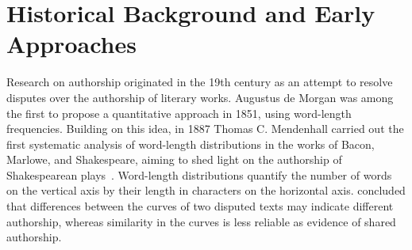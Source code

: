 \section{Historical Background and Early Approaches}
\label{sec:origin}

Research on authorship originated in the 19th century as an attempt to resolve disputes over the authorship of literary works. 
Augustus de Morgan was among the first to propose a quantitative approach in 1851, using word-length frequencies. 
Building on this idea, in 1887 Thomas C. Mendenhall carried out the first systematic analysis of word-length distributions in the works of Bacon, Marlowe, and Shakespeare, aiming to shed light on the authorship of Shakespearean plays~\citep{neal_surveying_2018,stamatatos_survey_2009}.
Word-length distributions quantify the number of words on the vertical axis by their length in characters on the horizontal axis. 
\citet{wordlengths_mendenhall_1887} concluded that differences between the curves of two disputed texts may indicate different authorship, whereas similarity in the curves is less reliable as evidence of shared authorship.

